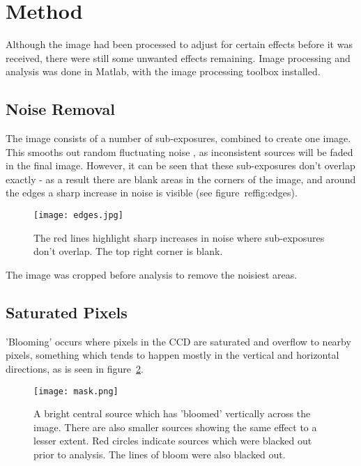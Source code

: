 \documentclass[a4paper,11pt,twoside]{article}
\begin{document}
\section{Method}

Although the image had been processed to adjust for certain effects 
before it was received, there were still some unwanted effects 
remaining. Image processing and analysis was done in Matlab, with 
the image processing toolbox installed.

\subsection{Noise Removal}

The image consists of a number of sub-exposures, combined to create one 
image. This smooths out random fluctuating noise , as inconsistent 
sources will be faded in the final image. However, it can be seen 
that these sub-exposures don't overlap exactly - as a result there 
are blank areas in the corners of the image, and around the edges a 
sharp increase in noise is visible (see figure~ref{fig:edges}). 

\begin{figure}[htb]
  \centering
  \texttt{[image: edges.jpg]}
  \caption{The red lines highlight sharp increases in noise where 
sub-exposures don't overlap. The top right corner is blank.}
  \label{fig:edges}
\end{figure}

The image was cropped before analysis to remove the noisiest areas.

\subsection{Saturated Pixels}

'Blooming' occurs where pixels in the CCD are saturated and overflow 
to nearby pixels, something which tends to happen mostly in the vertical
 and horizontal directions, as is seen in figure~\ref{fig:mask}.

\begin{figure}[htb]
  \centering
  \texttt{[image: mask.png]}
  \caption{A bright central source which has 'bloomed' vertically across
 the image. There are also smaller sources showing the same effect to 
a lesser extent. Red circles indicate sources which were blacked out 
prior to analysis. The lines of bloom were also blacked out.}
  \label{fig:mask}
\end{figure}
\end{document}

